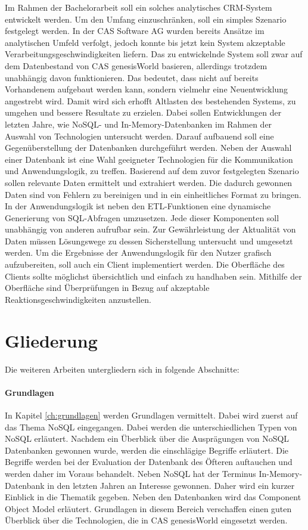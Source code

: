 Im Rahmen der Bachelorarbeit soll ein solches analytisches CRM-System entwickelt werden. Um den Umfang einzuschränken, soll ein simples Szenario festgelegt werden. In der CAS Software AG wurden bereits Ansätze im analytischen Umfeld verfolgt, jedoch konnte bis jetzt kein System akzeptable Verarbeitungsgeschwindigkeiten liefern. Das zu entwickelnde System soll zwar auf dem Datenbestand von CAS genesisWorld basieren, allerdings trotzdem unabhängig davon funktionieren. Das bedeutet, dass nicht auf bereits Vorhandenem aufgebaut werden kann, sondern vielmehr eine Neuentwicklung angestrebt wird. Damit wird sich erhofft Altlasten des bestehenden Systems, zu umgehen und bessere Resultate zu erzielen. Dabei sollen Entwicklungen der letzten Jahre, wie NoSQL- und In-Memory-Datenbanken im Rahmen der Auswahl von Technologien untersucht werden. Darauf aufbauend soll eine Gegenüberstellung der Datenbanken durchgeführt werden. Neben der Auswahl einer Datenbank ist eine Wahl geeigneter Technologien für die Kommunikation und Anwendungslogik, zu treffen. Basierend auf dem zuvor festgelegten Szenario sollen relevante Daten ermittelt und extrahiert werden. Die dadurch gewonnen Daten sind von Fehlern zu bereinigen und in ein einheitliches Format zu bringen.
In der Anwendungslogik ist neben den ETL-Funktionen eine dynamische Generierung von SQL-Abfragen umzusetzen. Jede dieser Komponenten soll unabhängig von anderen aufrufbar sein. Zur Gewährleistung der Aktualität von Daten müssen Lösungswege zu dessen Sicherstellung untersucht und umgesetzt werden. Um die Ergebnisse der Anwendungslogik für den Nutzer grafisch aufzubereiten, soll auch ein Client implementiert werden. Die Oberfläche des Clients sollte möglichst übersichtlich und einfach zu handhaben sein. Mithilfe der Oberfläche sind Überprüfungen in Bezug auf akzeptable Reaktionsgeschwindigkeiten anzustellen. 

\section{Gliederung}
\label{ch:Einfuehrung:sec:Gliederung}

Die weiteren Arbeiten untergliedern sich in folgende Abschnitte: 
 
\paragraph{Grundlagen} In Kapitel \ref{ch:grundlagen} werden Grundlagen vermittelt. Dabei wird zuerst auf das Thema NoSQL eingegangen. Dabei werden die unterschiedlichen Typen von NoSQL erläutert. Nachdem ein Überblick über die Ausprägungen von NoSQL Datenbanken gewonnen wurde, werden die einschlägige Begriffe erläutert. Die Begriffe werden bei der Evaluation der Datenbank des Öfteren auftauchen und werden daher im Voraus behandelt. Neben NoSQL hat der Terminus In-Memory-Datenbank in den letzten Jahren an Interesse gewonnen. Daher wird ein kurzer Einblick in die Thematik gegeben. Neben den Datenbanken wird das Component Object Model erläutert. Grundlagen in diesem Bereich verschaffen einen guten Überblick über die Technologien, die in CAS genesisWorld eingesetzt werden. 

